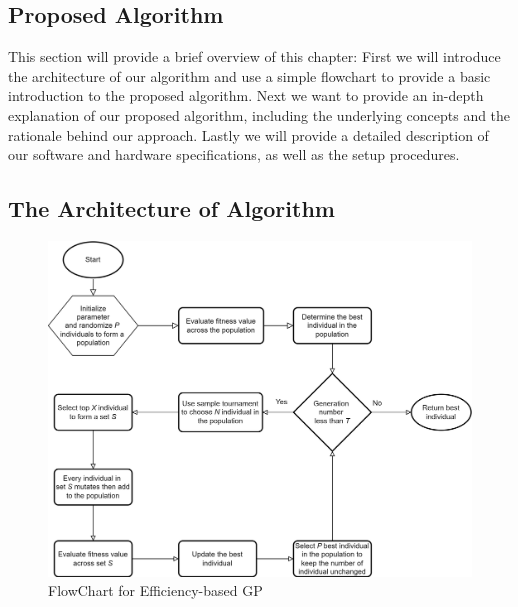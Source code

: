 \begin{ZhChapter}

\chapter{Proposed Algorithm}
This section will provide a brief overview of this chapter: First we will introduce the architecture of our algorithm and use a simple flowchart to provide a basic introduction to the proposed algorithm. Next we want to provide an in-depth explanation of our proposed algorithm, including the underlying concepts and the rationale behind our approach. Lastly we will provide a detailed description of our software and hardware specifications, as well as the setup procedures.
\section{The Architecture of Algorithm} %
\begin{figure}[htbp]
    \centering
    \includegraphics[width = 1\textwidth]{image/FlowChart.png}
    \caption{FlowChart for Efficiency-based GP}
    \label{fig: image}
\end{figure}



\end{ZhChapter}
